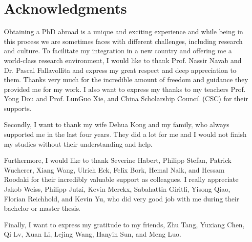 %
\chapter*{Acknowledgments}
\label{sec:acknowledgement}

Obtaining a PhD abroad is a unique and exciting experience and while being in this process we are sometimes faces with different challenges, including research and culture. To facilitate my integration in a new country and offering me a world-class research environment, I would like to thank Prof. Nassir Navab and Dr. Pascal Fallavollita and express my great respect and deep appreciation to them. Thanks very much for the incredible amount of freedom and guidance they provided me for my work. I also want to express my thanks to my teachers Prof. Yong Dou and Prof. LunGuo Xie, and China Scholarship Council (CSC) for their supports. 

Secondly, I want to thank my wife Dehua Kong and my family, who always supported me in the last four years. They did a lot for me and I would not finish my studies without their understanding and help.

Furthermore, I would like to thank Severine Habert, Philipp Stefan, Patrick Wucherer, Xiang Wang, Ulrich Eck, Felix Bork, Hemal Naik, and Hessam Roodaki for their incredibly valuable support as colleagues. I really appreciate Jakob Weiss, Philipp Jutzi, Kevin Merckx, Sabahattin Giritli, Yisong Qiao, Florian Reichhold, and Kevin Yu, who did very good job with me during their bachelor or master thesis.

Finally, I want to express my gratitude to my friends, Zhu Tang, Yuxiang Chen, Qi Lv, Xuan Li, Lejing Wang, Hanyin Sun, and Meng Luo.


